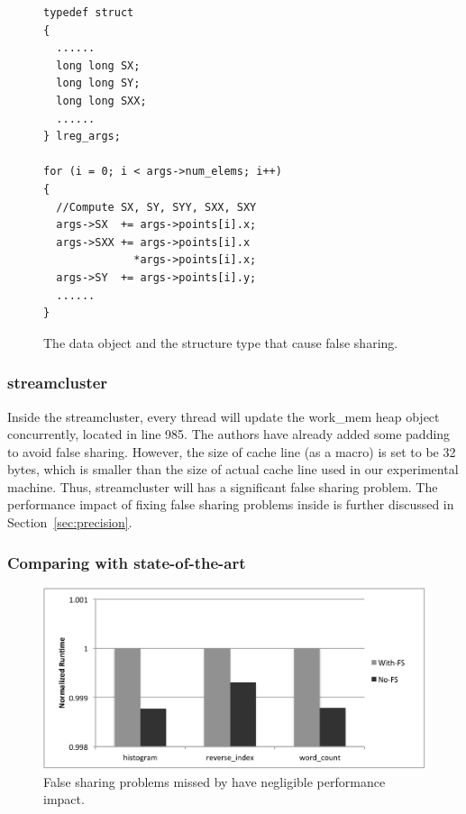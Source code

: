 \begin{figure}
\begin{verbatim}
typedef struct
{
  ......  
  long long SX;
  long long SY;
  long long SXX;
  ......
} lreg_args;	

for (i = 0; i < args->num_elems; i++)
{
  //Compute SX, SY, SYY, SXX, SXY
  args->SX  += args->points[i].x;
  args->SXX += args->points[i].x
              *args->points[i].x;
  args->SY  += args->points[i].y;
  ......
}
\end{verbatim}
\caption{The data object and the structure type that cause false sharing.}
\label{lr:code}
\end{figure}

\subsubsection{streamcluster}

Inside the streamcluster, every thread will update the work\_mem heap object concurrently, located in line 985. The authors have already added some padding to avoid false sharing. However, the size of cache line (as a macro) is set to be 32 bytes, which is smaller than the size of actual cache line used in our experimental machine. Thus, streamcluster will has a significant false sharing problem. The performance impact of fixing false sharing problems inside is further discussed in Section~\ref{sec:precision}. 


\subsubsection{Comparing with state-of-the-art}

\begin{figure}[htbp]
\centering
\label{fig:fseffectiveness}
\includegraphics[width=.8\columnwidth]{figure/trivial}
\caption{False sharing problems missed by \cheetah{} have negligible performance impact.}
\end{figure}


